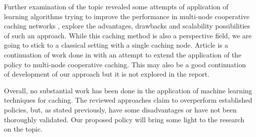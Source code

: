 Further examination of the topic revealed some attempts of application of learning algorithms trying to improve the performance in multi-node cooperative caching networks \cite{19}, explore the advantages, drawbacks and scalability possibilities of such an approach. While this caching method is also a perspective field, we are going to stick to a classical setting with a single caching node. Article \cite{24} is a continuation of work done in \cite{23} with an attempt to extend the application of the policy to multi-node cooperative caching. This may also be a good continuation of development of our approach but it is not explored in the report.

Overall, no substantial work has been done in the application of machine learning techniques for caching. The reviewed approaches claim to overperform established policies, but, as stated previously, have some disadvantages or have not been thoroughly validated. Our proposed policy will bring some light to the research on the topic.
